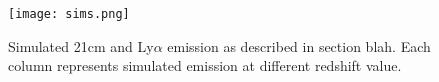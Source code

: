 \begin{figure}[ht]
	\centering
	\texttt{[image: sims.png]}
	\caption[Simulated 21cm and Ly$\alpha$ emission]{Simulated 21cm and Ly$\alpha$ emission
	 as described in section blah. Each column represents simulated emission at different
	 redshift value.}
	\label{fig:hera_layout}
\end{figure}
